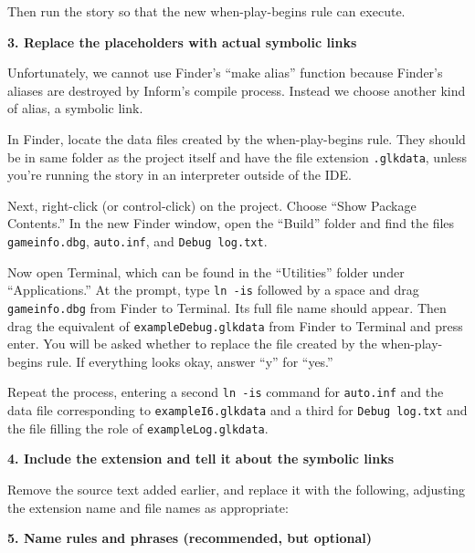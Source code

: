 \documentclass{book}
\newcommand{\lastpagebreak}{\vfill\pagebreak}
\begin{document}
\begin{quote}
  
\end{quote}

Then run the story so that the new when-play-begins rule can execute.

\textbf{3. Replace the placeholders with actual symbolic links}

Unfortunately, we cannot use Finder's ``make alias'' function because Finder's
aliases are destroyed by Inform's compile process.  Instead we choose another
kind of alias, a symbolic link.

In Finder, locate the data files created by the when-play-begins rule.  They
should be in same folder as the project itself and have the file extension
\texttt{.glkdata}, unless you're running the story in an interpreter outside of
the IDE.

Next, right-click (or control-click) on the project.  Choose ``Show Package
Contents.''  In the new Finder window, open the ``Build'' folder and find the
files \texttt{gameinfo.dbg}, \texttt{auto.inf}, and \texttt{Debug log.txt}.

Now open Terminal, which can be found in the ``Utilities'' folder under
``Applications.''  At the prompt, type \texttt{ln -is} followed by a space and
drag \texttt{gameinfo.dbg} from Finder to Terminal.  Its full file name should
appear.  Then drag the equivalent of \texttt{exampleDebug.glkdata} from Finder
to Terminal and press enter.  You will be asked whether to replace the file
created by the when-play-begins rule.  If everything looks okay, answer ``y''
for ``yes.''

Repeat the process, entering a second \texttt{ln -is} command for
\texttt{auto.inf} and the data file corresponding to \texttt{exampleI6.glkdata}
and a third for \texttt{Debug log.txt} and the file filling the role of
\texttt{exampleLog.glkdata}.

\lastpagebreak

\textbf{4. Include the extension and tell it about the symbolic links}

Remove the source text added earlier, and replace it with the following,
adjusting the extension name and file names as appropriate:

\begin{quote}
  
\end{quote}

\textbf{5. Name rules and phrases (recommended, but optional)}
\end{document}
